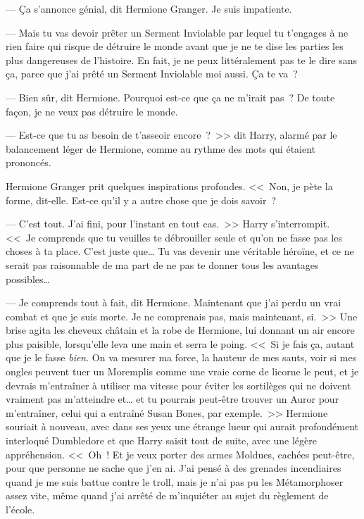 --- Ça s'annonce génial, dit Hermione Granger. Je suis impatiente.

--- Mais tu vas devoir prêter un Serment Inviolable par lequel tu t'engages à ne rien faire qui risque de détruire le monde avant que je ne te dise les parties les plus dangereuses de l'histoire. En fait, je ne peux littéralement pas te le dire sans ça, parce que j'ai prêté un Serment Inviolable moi aussi. Ça te va~?

--- Bien sûr, dit Hermione. Pourquoi est-ce que ça ne m'irait pas~? De toute façon, je ne veux pas détruire le monde.

--- Est-ce que tu as besoin de t'asseoir encore~?~>> dit Harry, alarmé par le balancement léger de Hermione, comme au rythme des mots qui étaient prononcés.

Hermione Granger prit quelques inspirations profondes. <<~Non, je pète la forme, dit-elle. Est-ce qu'il y a autre chose que je dois savoir~?

--- C'est tout. J'ai fini, pour l'instant en tout cas.~>> Harry s'interrompit. <<~Je comprends que tu veuilles te débrouiller seule et qu'on ne fasse pas les choses à ta place. C'est juste que… Tu vas devenir une véritable héroïne, et ce ne serait pas raisonnable de ma part de ne pas te donner tous les avantages possibles…

--- Je comprends tout à fait, dit Hermione. Maintenant que j'ai perdu un vrai combat et que je suis morte. Je ne comprenais pas, mais maintenant, si.~>> Une brise agita les cheveux châtain et la robe de Hermione, lui donnant un air encore plus paisible, lorsqu'elle leva une main et serra le poing. <<~Si je fais ça, autant que je le fasse \emph{bien}. On va mesurer ma force, la hauteur de mes sauts, voir si mes ongles peuvent tuer un Moremplis comme une vraie corne de licorne le peut, et je devrais m'entraîner à utiliser ma vitesse pour éviter les sortilèges qui ne doivent vraiment pas m'atteindre et… et tu pourrais peut-être trouver un Auror pour m'entraîner, celui qui a entraîné Susan Bones, par exemple.~>> Hermione souriait à nouveau, avec dans ses yeux une étrange lueur qui aurait profondément interloqué Dumbledore et que Harry saisit tout de suite, avec une légère appréhension. <<~Oh~! Et je veux porter des armes Moldues, cachées peut-être, pour que personne ne sache que j'en ai. J'ai pensé à des grenades incendiaires quand je me suis battue contre le troll, mais je n'ai pas pu les Métamorphoser assez vite, même quand j'ai arrêté de m'inquiéter au sujet du règlement de l'école.


